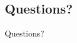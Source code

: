 \documentclass{beamer}
\begin{document}
\begin{darkframes}
    \section{Questions?}                           %
    \begin{frame}{Questions?}
    \end{frame}
    
  \end{darkframes}
\end{document}
